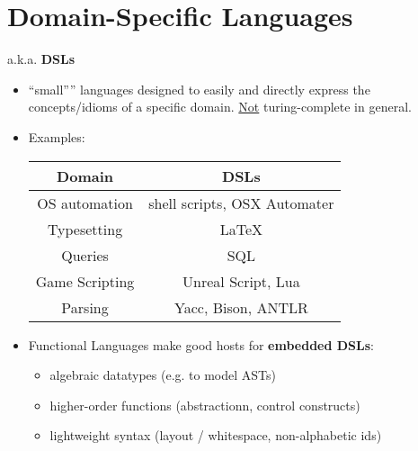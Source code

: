 


\chapter{Domain-Specific Languages} %
\label{cha:domain_specific_languages}
a.k.a. \textbf{DSLs}

\begin{itemize}
    \item ``small'''' languages designed to easily and directly express the concepts/idioms of a specific domain. \underline{Not} turing-complete in general.
    \item Examples:
        \vspace{9pt}\begin{center}\begin{tabular}{|c|c|}\hline
        \rowcolor{grau} Domain          & DSLs                                  \\\hline
                        OS automation   & shell scripts, OSX Automater          \\\hline
                        Typesetting     & \LaTeX                                \\\hline
                        Queries         & SQL                                   \\\hline
                        Game Scripting  & Unreal Script, Lua                    \\\hline
                        Parsing         & Yacc, Bison, ANTLR                    \\\hline
        \end{tabular}\end{center}\vspace{9pt}
    \item Functional Languages make good hosts for \textbf{embedded DSLs}:
        \begin{itemize}
            \item algebraic datatypes (e.g. to model ASTs)
            \item higher-order functions (abstractionn, control constructs)
            \item lightweight syntax (layout / whitespace, non-alphabetic ids)
        \end{itemize}
\end{itemize}


\newpage

